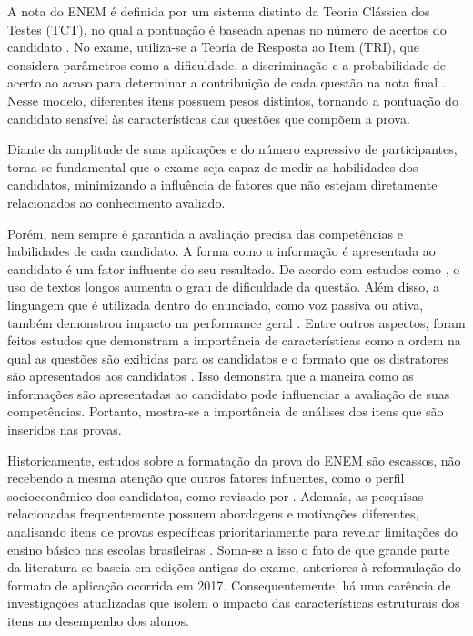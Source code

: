 \documentclass[a4paper,10pt, twocolumn]{article}
\begin{document}
A nota do ENEM é definida por um sistema distinto da Teoria Clássica dos Testes (TCT), no qual a pontuação é baseada apenas no número de acertos do candidato \cite{sousa_teoria_2020}. No exame, utiliza-se a Teoria de Resposta ao Item (TRI), que considera parâmetros como a dificuldade, a discriminação e a probabilidade de acerto ao acaso para determinar a contribuição de cada questão na nota final \cite{inep2021enem}. Nesse modelo, diferentes itens possuem pesos distintos, tornando a pontuação do candidato sensível às características das questões que compõem a prova.

Diante da amplitude de suas aplicações e do número expressivo de participantes, torna-se fundamental que o exame seja capaz de medir as habilidades dos candidatos, minimizando a influência de fatores que não estejam diretamente relacionados ao conhecimento avaliado.

Porém, nem sempre é garantida a avaliação precisa das competências e habilidades de cada candidato. A forma como a informação é apresentada ao candidato é um fator influente do seu resultado. De acordo com estudos como \textcite{Pullishery2020,2018,silva2019desempenho}, o uso de textos longos aumenta o grau de dificuldade da questão. Além disso, a linguagem que é utilizada dentro do enunciado, como voz passiva ou ativa, também demonstrou impacto na performance geral \cite{correia2004complexidade,Marcom2016}. Entre outros aspectos, foram feitos estudos que demonstram a importância de características como a ordem na qual as questões são exibidas para os candidatos \cite{Barichello2022,Anaya2023} e o formato que os distratores são apresentados aos candidatos \cite{Marcom2016,lopes2015estudo,Caldwell2013}. Isso demonstra que a maneira como as informações são apresentadas ao candidato pode influenciar a avaliação de suas competências. Portanto, mostra-se a importância de análises dos itens que são inseridos nas provas. 

Historicamente, estudos sobre a formatação da prova do ENEM são escassos, não recebendo a mesma atenção que outros fatores influentes, como o perfil socioeconômico dos candidatos, como revisado por \textcite{Dutra2023}. Ademais, as pesquisas relacionadas frequentemente possuem abordagens e motivações diferentes, analisando itens de provas específicas prioritariamente para revelar limitações do ensino básico nas escolas brasileiras \cite{Cestaro2020, lopes2015estudo}. Soma-se a isso o fato de que grande parte da literatura se baseia em edições antigas do exame, anteriores à reformulação do formato de aplicação ocorrida em 2017. Consequentemente, há uma carência de investigações atualizadas que isolem o impacto das características estruturais dos itens no desempenho dos alunos.
\end{document}
